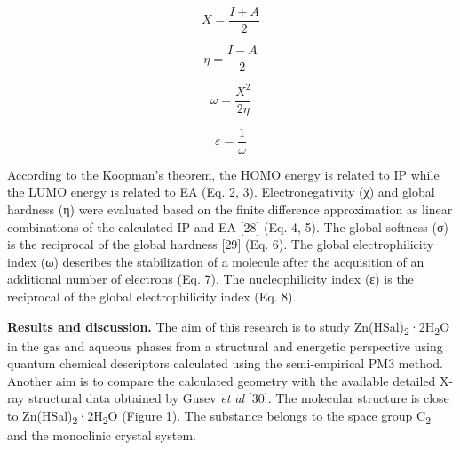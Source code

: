 \begin{multicols}{2}
\begin{equation}
    X=\frac{I+A}{2}
\end{equation}

\begin{equation}
    \eta=\frac{I-A}{2}
\end{equation}

\begin{equation}
    \omega=\frac{X^2}{2\eta}
\end{equation}

\begin{equation}
    \varepsilon=\frac{1}{\omega}
\end{equation}

According to the Koopman's theorem, the HOMO energy is related to IP
while the LUMO energy is related to EA (Eq. 2, 3). Electronegativity (χ)
and global hardness (η) were evaluated based on the finite difference
approximation as linear combinations of the calculated IP and EA
{[}28{]} (Eq. 4, 5). The global softness (σ) is the reciprocal of the
global hardness {[}29{]} (Eq. 6). The global electrophilicity index (ω)
describes the stabilization of a molecule after the acquisition of an
additional number of electrons (Eq. 7). The nucleophilicity index (ε) is
the reciprocal of the global electrophilicity index (Eq. 8).

{\bfseries Results and discussion.} The aim of this research is to study
Zn(HSal)\textsubscript{2}·2H\textsubscript{2}O in the gas and aqueous
phases from a structural and energetic perspective using quantum
chemical descriptors calculated using the semi-empirical PM3 method.
Another aim is to compare the calculated geometry with the available
detailed X-ray structural data obtained by Gusev \emph{et al} {[}30{]}.
The molecular structure is close to
Zn(HSal)\textsubscript{2}·2H\textsubscript{2}O (Figure 1). The substance
belongs to the space group C\textsubscript{2} and the monoclinic crystal
system.
\end{multicols}

